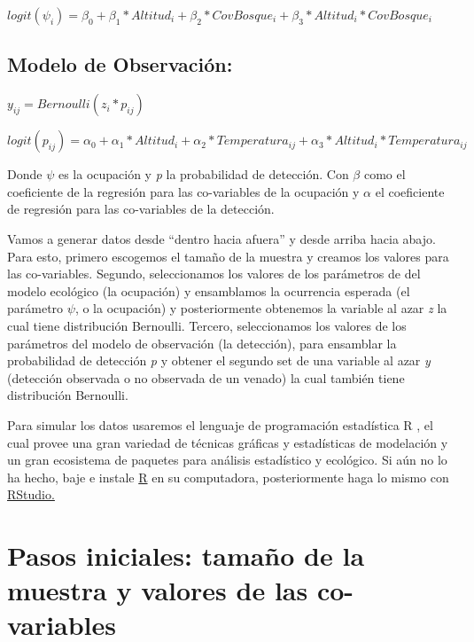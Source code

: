 \documentclass[]{book}
\begin{document}
\(logit(\psi _{i}) = \beta _{0} + \beta _{1} \ast Altitud _{i} + \beta _{2}\ast CovBosque _{i} + \beta _{3} \ast Altitud _{i} \ast CovBosque _{i}\)

\subsection{Modelo de Observación:}\label{modelo-de-observacion}

\(y _{ij} = Bernoulli (z _{i} * p _{ij})\)

\(logit(p _{ij}) = \alpha _{0} + \alpha _{1} \ast Altitud _{i} + \alpha _{2}\ast Temperatura _{ij} + \alpha _{3} \ast Altitud _{i} \ast Temperatura _{ij}\)

Donde \(\psi\) es la ocupación y \emph{p} la probabilidad de detección.
Con \(\beta\) como el coeficiente de la regresión para las co-variables
de la ocupación y \(\alpha\) el coeficiente de regresión para las
co-variables de la detección.

Vamos a generar datos desde ``dentro hacia afuera'' y desde arriba hacia
abajo. Para esto, primero escogemos el tamaño de la muestra y creamos
los valores para las co-variables. Segundo, seleccionamos los valores de
los parámetros de del modelo ecológico (la ocupación) y ensamblamos la
ocurrencia esperada (el parámetro \(\psi\), o la ocupación) y
posteriormente obtenemos la variable al azar \emph{z} la cual tiene
distribución Bernoulli. Tercero, seleccionamos los valores de los
parámetros del modelo de observación (la detección), para ensamblar la
probabilidad de detección \emph{p} y obtener el segundo set de una
variable al azar \emph{y} (detección observada o no observada de un
venado) la cual también tiene distribución Bernoulli.

Para simular los datos usaremos el lenguaje de programación estadística
R \citep{RCoreTeam2016}, el cual provee una gran variedad de técnicas
gráficas y estadísticas de modelación y un gran ecosistema de paquetes
para análisis estadístico y ecológico. Si aún no lo ha hecho, baje e
instale \href{http://www.r-project.org/}{R} en su computadora,
posteriormente haga lo mismo con
\href{http://www.rstudio.com/}{RStudio.}

\section{Pasos iniciales: tamaño de la muestra y valores de las
co-variables}\label{pasos-iniciales-tamano-de-la-muestra-y-valores-de-las-co-variables}
\end{document}
